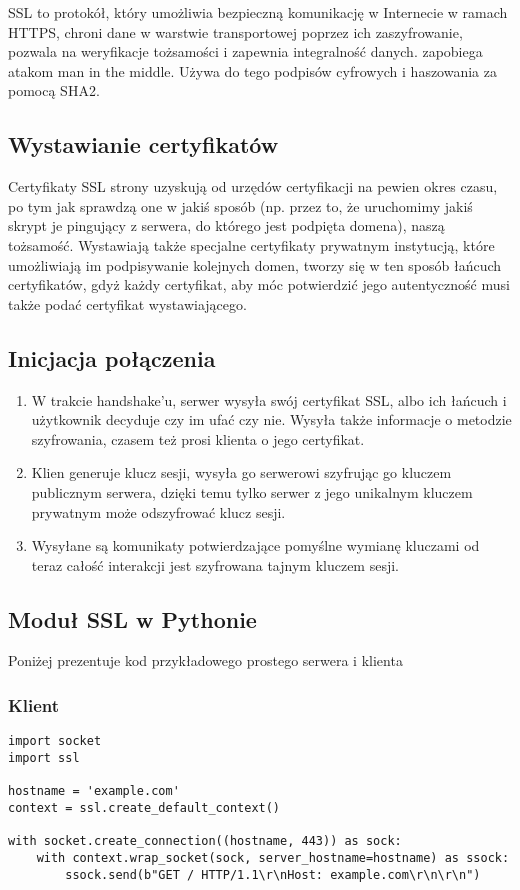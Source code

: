 SSL to protokół, który umożliwia bezpieczną komunikację w Internecie w ramach HTTPS, chroni dane w warstwie transportowej poprzez ich zaszyfrowanie, pozwala na weryfikacje tożsamości i zapewnia integralność danych. zapobiega atakom man in the middle. Używa do tego podpisów cyfrowych i haszowania za pomocą SHA2.
\subsection{Wystawianie certyfikatów}
Certyfikaty SSL strony uzyskują od urzędów certyfikacji na pewien okres czasu, po tym jak sprawdzą one w jakiś sposób (np. przez to, że uruchomimy jakiś skrypt je pingujący z serwera, do którego jest podpięta domena), naszą tożsamość. Wystawiają także specjalne certyfikaty prywatnym instytucją, które umożliwiają im podpisywanie kolejnych domen, tworzy się w ten sposób łańcuch certyfikatów, gdyż każdy certyfikat, aby móc potwierdzić jego autentyczność musi także podać certyfikat wystawiającego.
\subsection{Inicjacja połączenia}
\begin{enumerate}
    \item W trakcie handshake'u, serwer wysyła swój certyfikat SSL, albo ich łańcuch i użytkownik decyduje czy im ufać czy nie. Wysyła także informacje o metodzie szyfrowania, czasem też prosi klienta o jego certyfikat.
    \item Klien generuje klucz sesji, wysyła go serwerowi szyfrując go kluczem publicznym serwera, dzięki temu tylko serwer z jego unikalnym kluczem prywatnym może odszyfrować klucz sesji.
    \item Wysyłane są komunikaty potwierdzające pomyślne wymianę kluczami od teraz całość interakcji jest szyfrowana tajnym kluczem sesji.
\end{enumerate}
\subsection{Moduł SSL w Pythonie}
Poniżej prezentuje kod przykładowego prostego serwera i klienta 
\subsubsection{Klient}
\begin{verbatim}
import socket
import ssl

hostname = 'example.com'
context = ssl.create_default_context()

with socket.create_connection((hostname, 443)) as sock:
    with context.wrap_socket(sock, server_hostname=hostname) as ssock:
        ssock.send(b"GET / HTTP/1.1\r\nHost: example.com\r\n\r\n")
\end{verbatim}
